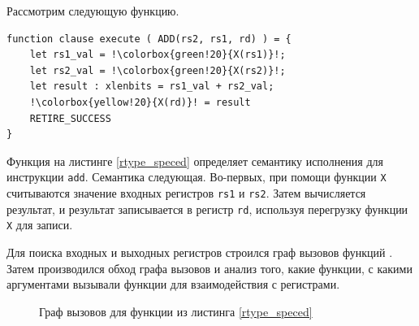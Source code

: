 Рассмотрим следующую функцию.

\begin{lstlisting}[caption={Пример определения функции, задающей семантику исполнения инструкции \texttt{add}}, language=sail, escapechar=!, label=rtype_speced, frame=single]
function clause execute ( ADD(rs2, rs1, rd) ) = {
    let rs1_val = !\colorbox{green!20}{X(rs1)}!;
    let rs2_val = !\colorbox{green!20}{X(rs2)}!;
    let result : xlenbits = rs1_val + rs2_val;
    !\colorbox{yellow!20}{X(rd)}! = result
    RETIRE_SUCCESS
}
\end{lstlisting}

Функция на листинге \ref{rtype_speced} определяет семантику исполнения для инструкции \texttt{add}.
Семантика следующая. Во-первых, при помощи функции \texttt{X} считываются значение входных регистров \texttt{rs1} и \texttt{rs2}.
Затем вычисляется результат, и результат записывается в регистр \texttt{rd}, используя перегрузку функции \texttt{X} для записи.

Для поиска входных и выходных регистров строился граф вызовов функций \cite{ryder1979call_graph}.
Затем производился обход графа вызовов и анализ того, какие функции, с какими аргументами вызывали функции для взаимодействия с регистрами.

\begin{figure}[H]

  \centering
  \caption{Граф вызовов для функции из листинга \ref{rtype_speced}}
  \label{add_g}
\end{figure}

